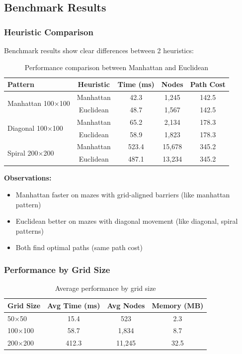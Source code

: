 \documentclass[12pt,a4paper]{article}
\begin{document}
\subsection{Benchmark Results}

\subsubsection{Heuristic Comparison}
Benchmark results show clear differences between 2 heuristics:

\begin{table}[h]
\centering
\begin{tabular}{|l|c|c|c|c|}
\hline
\textbf{Pattern} & \textbf{Heuristic} & \textbf{Time (ms)} & \textbf{Nodes} & \textbf{Path Cost} \\
\hline
\multirow{2}{*}{Manhattan 100×100} & Manhattan & 42.3 & 1,245 & 142.5 \\
& Euclidean & 48.7 & 1,567 & 142.5 \\
\hline
\multirow{2}{*}{Diagonal 100×100} & Manhattan & 65.2 & 2,134 & 178.3 \\
& Euclidean & 58.9 & 1,823 & 178.3 \\
\hline
\multirow{2}{*}{Spiral 200×200} & Manhattan & 523.4 & 15,678 & 345.2 \\
& Euclidean & 487.1 & 13,234 & 345.2 \\
\hline
\end{tabular}
\caption{Performance comparison between Manhattan and Euclidean}
\end{table}

\textbf{Observations:}
\begin{itemize}
    \item Manhattan faster on mazes with grid-aligned barriers (like manhattan pattern)
    \item Euclidean better on mazes with diagonal movement (like diagonal, spiral patterns)
    \item Both find optimal paths (same path cost)
\end{itemize}

\subsubsection{Performance by Grid Size}
\begin{table}[h]
\centering
\begin{tabular}{|l|c|c|c|}
\hline
\textbf{Grid Size} & \textbf{Avg Time (ms)} & \textbf{Avg Nodes} & \textbf{Memory (MB)} \\
\hline
50×50 & 15.4 & 523 & 2.3 \\
100×100 & 58.7 & 1,834 & 8.7 \\
200×200 & 412.3 & 11,245 & 32.5 \\
\hline
\end{tabular}
\caption{Average performance by grid size}
\end{table}
\end{document}

